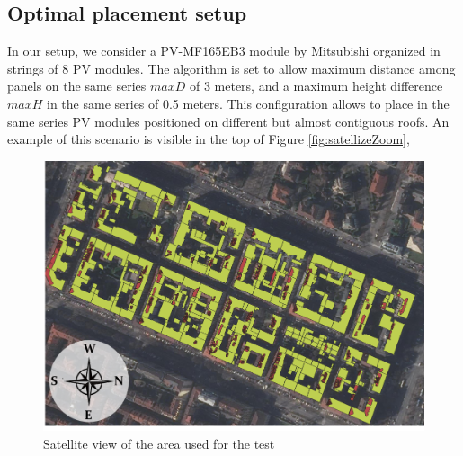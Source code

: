 \subsection{Optimal placement setup}
In our setup, we consider a PV-MF165EB3 module by Mitsubishi \cite{datasheet} organized in strings of 8 PV modules. The algorithm is set to allow maximum distance among panels on the same series $maxD$ of 3 meters, and a maximum height difference $maxH$ in the same series of 0.5 meters. This configuration allows to place in the same series PV modules positioned on different but almost contiguous roofs. An example of this scenario is visible in the top of Figure \ref{fig:satellizeZoom}, 
\begin{figure}[!htbp]
\centering
\includegraphics[width=\linewidth]{images/satellite3.png}\vspace{-0.4cm}
\caption{Satellite view of the area used for the test}
\label{fig:satellite}
\end{figure}

